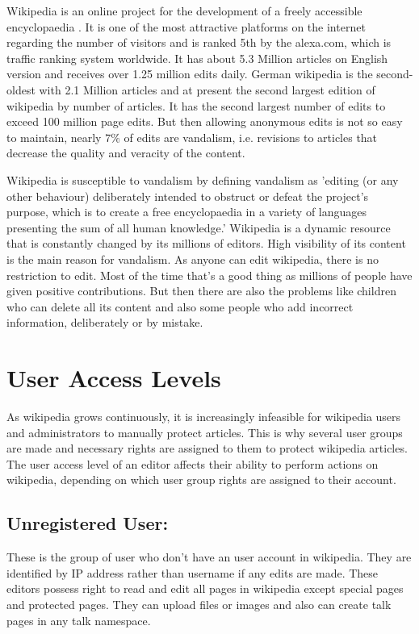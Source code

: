 \documentclass[12pt]{article}
\begin{document}
Wikipedia is an online project for the development of a freely accessible encyclopaedia \cite{O'Sullivan}. It is one of the most attractive platforms on the internet regarding the number of visitors and is ranked 5th  by the alexa.com, which is traffic ranking system worldwide\cite{alexa}. It has about 5.3 Million articles on English version and receives over 1.25 million edits daily. German wikipedia is the second-oldest with 2.1 Million articles and at present the second largest edition of wikipedia by number of articles. It has the second largest number of edits to exceed 100 million page edits\cite{german}. But then allowing anonymous edits is not so easy to maintain, nearly $7 \%$ \cite{potthast} of edits are vandalism, i.e. revisions to articles that decrease the quality and veracity of the content.\par Wikipedia is susceptible to vandalism by defining vandalism as 'editing (or  any other behaviour) deliberately intended to obstruct or defeat the project's purpose, which is to create a free encyclopaedia in a variety of languages presenting the sum of all human knowledge\cite{vandalism}.' Wikipedia is a dynamic resource that is constantly changed by its millions of editors. High visibility of its content is the main reason for vandalism. As anyone can edit wikipedia, there is no restriction to edit. Most of the time that's a good thing as millions of people have given positive contributions. But then there are also the problems like  children who can delete all its content and also some people who add incorrect information, deliberately or by mistake.



\section{User Access Levels}
As wikipedia grows continuously, it is increasingly infeasible for wikipedia users and administrators to manually protect articles. This is why several user groups are made and necessary rights are assigned to them to protect wikipedia articles. The user access level of an editor affects their ability to perform actions on wikipedia, depending on which user group rights are assigned to their account\cite{user}.
\subsection*{Unregistered User:}
These is the group of user who don’t have an user account in wikipedia. They are identified by IP address rather than username if any edits are made. These editors possess right to read and edit all pages in wikipedia except special pages and protected pages. They can upload files or images and also can create talk pages in any talk namespace.
\end{document}
